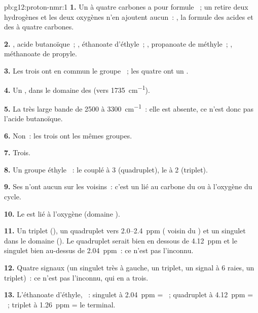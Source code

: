 \begin{solution}{pb:g12:proton-nmr:1}
\textbf{1.} Un  à quatre carbones a pour formule ~; un
 retire deux hydrogènes et les deux oxygènes n'en ajoutent
aucun~: , la formule des acides et des  à quatre
carbones.

\textbf{2.} , acide butanoïque~;
, éthanoate d'éthyle~; ,
propanoate de méthyle~; , méthanoate de propyle.

\textbf{3.} Les trois  ont en commun le groupe ~; les quatre
ont un .

\textbf{4.} Un , dans le domaine des  (vers
\qty{1735}{cm^{-1}}).

\textbf{5.} La très large bande  de 2500 à
\qty{3300}{cm^{-1}}~: elle est absente, ce n'est donc pas l'acide
butanoïque.

\textbf{6.} Non~: les trois  ont les mêmes groupes.

\textbf{7.} Trois.

\textbf{8.} Un groupe éthyle ~: le  couplé à 3
 (quadruplet), le  à 2 (triplet).

\textbf{9.} Ses  n'ont aucun  sur les  voisins~: c'est
un  lié au carbone du  ou à l'oxygène du cycle.

\textbf{10.} Le  est lié à l'oxygène (domaine ).

\textbf{11.} Un triplet (), un quadruplet vers 2.0--\qty{2.4}{ppm}
( voisin du ) et un singulet dans le domaine 
(). Le quadruplet serait bien en dessous de \qty{4.12}{ppm} et
le singulet bien au-dessus de \qty{2.04}{ppm}~: ce n'est pas l'inconnu.

\textbf{12.} Quatre signaux (un singulet très à gauche, un triplet, un
signal à 6 raies, un triplet)~: ce n'est pas l'inconnu, qui en a trois.

\textbf{13.} L'éthanoate d'éthyle, ~: singulet à
\qty{2.04}{ppm} = ~; quadruplet à \qty{4.12}{ppm} =
~; triplet à \qty{1.26}{ppm} = le  terminal.


\end{solution}
